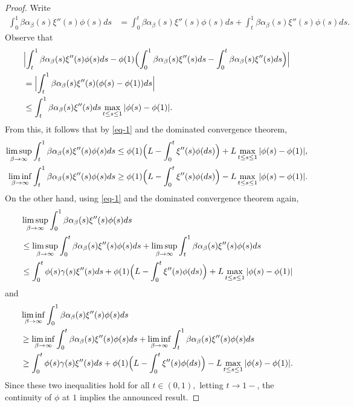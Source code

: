 \documentclass[12pt]{article}
\def\n{\noindent}
\def\n{\noindent}
\newenvironment{Proof of lemma}{\noindent{\bf Proof of Lemma}}{\hfill$\Box$\newline}
\newenvironment{Proof of theorem}{\noindent{\bf Proof of Theorem}}{\hfill{\footnotesize${\square}$}\newline}
\newenvironment{Proof of theorems}{\noindent{\bf Proof of Theorems}}{\hfill$\Box$\newline}
\newenvironment{Proof of proposition}{\noindent{\bf Proof of Proposition}}{\hfill$\Box$\newline}
\newenvironment{Proof of propositions}{\noindent{\bf Proof of Propositions}}{\hfill$\Box$\newline}
\newenvironment{Proof of exercise}{\noindent{\it Proof of Exercise:}}{\hfill$\Box$}
\begin{document}
\begin{proof}
	Write
	\begin{align*}
	\int_0^1\beta\alpha_\beta(s)\xi''(s) \phi(s)ds&=\int_0^t\beta\alpha_\beta(s)\xi''(s) \phi(s)ds+\int_t^1\beta\alpha_\beta(s)\xi''(s) \phi(s)ds.
	\end{align*}
	Observe that
	\begin{align*}
	&\Bigl|\int_t^1\beta\alpha_\beta(s)\xi''(s) \phi(s)ds- \phi(1)\Bigl(\int_0^1\beta\alpha_\beta(s)\xi''(s)ds-\int_0^t\beta\alpha_\beta(s)\xi''(s)ds\Bigr)\Bigr|\\
	&=\Bigl|\int_t^1\beta\alpha_\beta(s)\xi''(s)( \phi(s)- \phi(1))ds\Bigr|\\
	&\leq \int_t  ^1\beta\alpha_\beta(s)\xi''(s)ds\max_{t\leq s\leq 1}| \phi(s)- \phi(1)|.
	\end{align*}
	From this, it follows that by \eqref{eq-1} and the dominated convergence theorem,
	\begin{align*}
	\limsup_{\beta\rightarrow\infty}\int_t^1\beta\alpha_\beta(s)\xi''(s) \phi(s)ds&\leq  \phi(1)\Bigl(L-\int_0^t\xi''(s)\n\phi(ds)\Bigr)+L  \max_{t\leq s\leq 1}| \phi(s)- \phi(1)|,\\
	\liminf_{\beta\rightarrow\infty}\int_t^1\beta\alpha_\beta(s)\xi''(s) \phi(s)ds&\geq  \phi(1)\Bigl(L-\int_0^t\xi''(s)\n\phi(ds)\Bigr)-L  \max_{t\leq s\leq 1}| \phi(s)- \phi(1)|.
	\end{align*}
	On the other hand, using \eqref{eq-1} and the dominated convergence theorem again,
	\begin{align*}
	&\limsup_{\beta\rightarrow\infty}\int_0  ^1\beta\alpha_\beta(s)\xi''(s) \phi(s)ds\\
	&\leq \limsup_{\beta\rightarrow\infty}\int_0  ^t\beta\alpha_\beta(s)\xi''(s) \phi(s)ds+\limsup_{\beta\rightarrow\infty}\int_t^1\beta\alpha_\beta(s)\xi''(s) \phi(s)ds\\
	&\leq\int_0  ^t \phi(s)\gamma(s)\xi''(s)ds+  \phi(1)\Bigl(L-\int_0^t\xi''(s)\n\phi(ds)\Bigr)+L  \max_{t\leq s\leq 1}| \phi(s)- \phi(1)|
	\end{align*} 
	and
	\begin{align*}
	&\liminf_{\beta\rightarrow\infty}\int_0  ^1\beta\alpha_\beta(s)\xi''(s) \phi(s)ds\\
	&\geq \liminf_{\beta\rightarrow\infty}\int_0  ^t\beta\alpha_\beta(s)\xi''(s) \phi(s)ds+\liminf_{\beta\rightarrow\infty}\int_t^1\beta\alpha_\beta(s)\xi''(s) \phi(s)ds\\
	&\geq \int_0^t \phi(s)\gamma(s)\xi''(s)ds+  \phi(1)\Bigl(L-\int_0^t\xi''(s)\n\phi(ds)\Bigr)-L  \max_{t\leq s\leq 1}| \phi(s)- \phi(1)|.
	\end{align*} 
	Since these two inequalities hold for all $t\in(0,1),$ letting $t\rightarrow 1-$, the continuity of $\phi$ at $1$ implies the announced result.
\end{proof}
\end{document}
